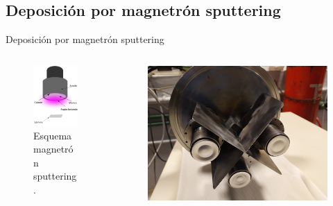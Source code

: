 \documentclass[11pt]{beamer}
\begin{document}
	\subsection{Deposición por magnetrón sputtering}
		\begin{frame}{Deposición por magnetrón sputtering}
			\begin{columns}[T]
				\begin{column}{.4\textwidth}
					\begin{figure}[H]
					\centering
					\includegraphics[scale=0.2]{img/SchemaDeposition.png}
					\caption{Esquema magnetrón sputtering.}
					\end{figure}
				\end{column}
				\begin{column}{.58\textwidth}
					\begin{figure}[H]
					\includegraphics[scale=0.04]{img/magnetrones.jpg}
					\end{figure}
				\end{column}
			\end{columns}
		\end{frame}
\end{document}

